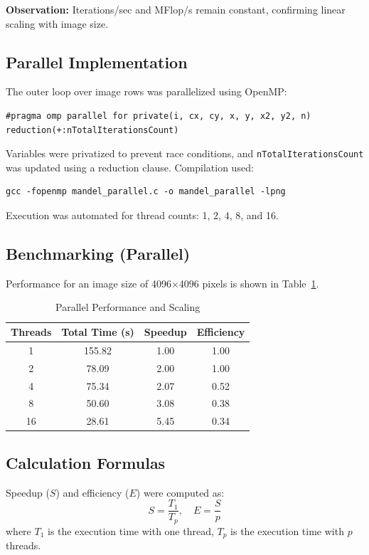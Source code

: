 \documentclass[unicode,11pt,a4paper,oneside,numbers=endperiod,openany]{scrartcl}
\begin{document}
\textbf{Observation:} Iterations/sec and MFlop/s remain constant, confirming linear scaling with image size.

\subsection{Parallel Implementation}
The outer loop over image rows was parallelized using OpenMP:
\begin{verbatim}
#pragma omp parallel for private(i, cx, cy, x, y, x2, y2, n) reduction(+:nTotalIterationsCount)
\end{verbatim}

Variables were privatized to prevent race conditions, and \texttt{nTotalIterationsCount} was updated using a reduction clause. Compilation used:
\begin{verbatim}
gcc -fopenmp mandel_parallel.c -o mandel_parallel -lpng
\end{verbatim}

Execution was automated for thread counts: 1, 2, 4, 8, and 16.

\subsection{Benchmarking (Parallel)}
Performance for an image size of 4096$\times$4096 pixels is shown in Table~\ref{tab:parallel_perf}.

\begin{table}[h!]
\centering
\caption{Parallel Performance and Scaling}
\label{tab:parallel_perf}
\begin{tabular}{|c|c|c|c|}
\hline
\textbf{Threads} & \textbf{Total Time (s)} & \textbf{Speedup} & \textbf{Efficiency} \\
\hline
1  & 155.82 & 1.00 & 1.00 \\
2  & 78.09  & 2.00 & 1.00 \\
4  & 75.34  & 2.07 & 0.52 \\
8  & 50.60  & 3.08 & 0.38 \\
16 & 28.61  & 5.45 & 0.34 \\
\hline
\end{tabular}
\end{table}

\subsection{Calculation Formulas}
Speedup ($S$) and efficiency ($E$) were computed as:
\[
S = \frac{T_1}{T_p}, \quad E = \frac{S}{p}
\]
where $T_1$ is the execution time with one thread, $T_p$ is the execution time with $p$ threads.
\end{document}
